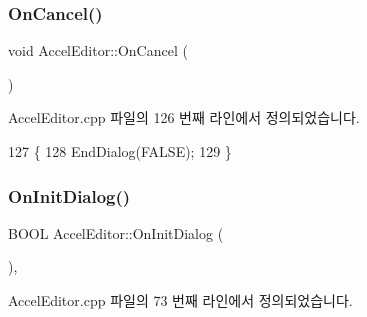 \mbox{\label{class_accel_editor_a50b1043d4af01df3925f193b7755c05e}} 
\subsubsection{\texorpdfstring{On\+Cancel()}{OnCancel()}}
{\footnotesize\ttfamily void Accel\+Editor\+::\+On\+Cancel (\begin{DoxyParamCaption}{ }\end{DoxyParamCaption})\hspace{0.3cm}{\ttfamily [protected]}}



Accel\+Editor.\+cpp 파일의 126 번째 라인에서 정의되었습니다.


\begin{DoxyCode}
127 \{
128   EndDialog(FALSE);
129 \}
\end{DoxyCode}
\mbox{\label{class_accel_editor_a131b32f139220aadd5e36b4ddeb8cd58}} 
\subsubsection{\texorpdfstring{On\+Init\+Dialog()}{OnInitDialog()}}
{\footnotesize\ttfamily B\+O\+OL Accel\+Editor\+::\+On\+Init\+Dialog (\begin{DoxyParamCaption}{ }\end{DoxyParamCaption})\hspace{0.3cm}{\ttfamily [protected]}, {\ttfamily [virtual]}}



Accel\+Editor.\+cpp 파일의 73 번째 라인에서 정의되었습니다.


